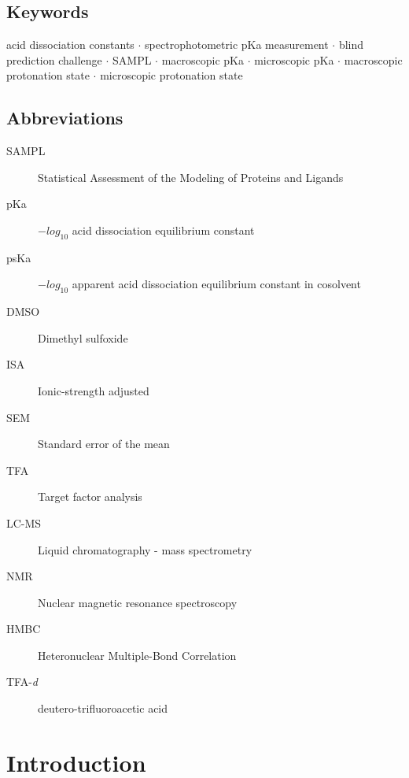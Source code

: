 \documentclass[9pt,lineno]{elife}
\begin{document}
\subsection{Keywords}
acid dissociation constants $\cdot$ spectrophotometric pKa measurement $\cdot$ blind prediction challenge $\cdot$ SAMPL $\cdot$ macroscopic pKa $\cdot$ microscopic pKa  $\cdot$ macroscopic protonation state $\cdot$ microscopic protonation state

\subsection{Abbreviations}
\begin{description}
\item[SAMPL] Statistical Assessment of the Modeling of Proteins and Ligands
\item[pKa] $-log_{10}$ acid dissociation equilibrium constant
\item[psKa] $-log_{10}$ apparent acid dissociation equilibrium constant in cosolvent
\item[DMSO] Dimethyl sulfoxide
\item[ISA] Ionic-strength adjusted
\item[SEM] Standard error of the mean
\item[TFA] Target factor analysis
\item[LC-MS] Liquid chromatography - mass spectrometry
\item[NMR] Nuclear magnetic resonance spectroscopy
\item[HMBC] Heteronuclear Multiple-Bond Correlation
\item[TFA-\textit{d}] deutero-trifluoroacetic acid
\end{description}

\section{Introduction}
\end{document}
